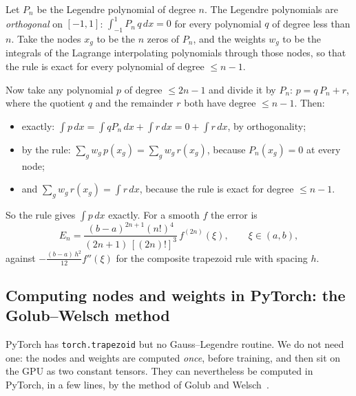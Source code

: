 \documentclass[11pt]{article}
\newcommand{\code}[1]{\texttt{#1}}
\begin{document}
\begin{aside}
Let $P_n$ be the Legendre polynomial of degree $n$. The Legendre polynomials are
\emph{orthogonal} on $[-1,1]$: $\int_{-1}^1 P_n\,q\,dx = 0$ for every polynomial $q$ of degree
less than $n$. Take the nodes $x_g$ to be the $n$ zeros of $P_n$, and the weights $w_g$ to be the
integrals of the Lagrange interpolating polynomials through those nodes, so that the rule is
exact for every polynomial of degree $\le n-1$.

Now take any polynomial $p$ of degree $\le 2n-1$ and divide it by $P_n$: $p = q\,P_n + r$, where
the quotient $q$ and the remainder $r$ both have degree $\le n-1$. Then:
\begin{itemize}
  \item exactly: $\int p\,dx = \int q P_n\,dx + \int r\,dx = 0 + \int r\,dx$, by orthogonality;
  \item by the rule: $\sum_g w_g\,p(x_g) = \sum_g w_g\,r(x_g)$, because $P_n(x_g) = 0$ at every node;
  \item and $\sum_g w_g\,r(x_g) = \int r\,dx$, because the rule is exact for degree $\le n-1$.
\end{itemize}
So the rule gives $\int p\,dx$ exactly. For a smooth $f$ the error is
\begin{equation}
  E_n = \frac{(b-a)^{2n+1}(n!)^4}{(2n+1)\,[(2n)!]^3}\,f^{(2n)}(\xi), \qquad \xi\in(a,b),
\end{equation}
against $-\frac{(b-a)\,h^2}{12} f''(\xi)$ for the composite trapezoid rule with spacing $h$.
\end{aside}

\subsection{Computing nodes and weights in PyTorch: the Golub--Welsch method}

PyTorch has \code{torch.trapezoid} but no Gauss--Legendre routine. We do not need one: the
nodes and weights are computed \emph{once}, before training, and then sit on the GPU as two
constant tensors. They can nevertheless be computed in PyTorch, in a few lines, by the method
of Golub and Welsch~\cite{golubwelsch}.
\end{document}
